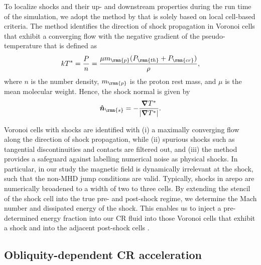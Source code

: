 \documentclass[8pt,a4paper,usenatbib]{mnras}
\newcommand{\CR}{\rmn{cr}}
\renewcommand{\th}{\rmn{th}}
\newcommand{\AREPO}{{\sc arepo}\xspace}
\newcommand{\bnabla}{\ensuremath{\boldsymbol{\nabla}}}
\begin{document}
To localize shocks and their up- and downstream properties during the run time
of the simulation, we adopt the method by \citet{2015MNRAS.446.3992S} that is
solely based on local cell-based criteria. The method identifies the direction
of shock propagation in Voronoi cells that exhibit a converging flow with the
negative gradient of the pseudo-temperature that is defined as
\begin{equation}
  \label{eq:temp}
  k T^* = \frac{P}{n} = \frac{\mu m_\rmn{p} (P_\th + P_\CR)}{\rho},
\end{equation}
where $n$ is the number density, $m_\rmn{p}$ is the proton rest mass, and $\mu$ is the
mean molecular weight. Hence, the shock normal is given by
\begin{equation}
  \label{eq:direction}
  \bm{\hat{n}}_\rmn{s} = -\frac{\bnabla T^*}{\left|\bnabla T^*\right|}.
\end{equation}

Voronoi cells with shocks are identified with (i) a maximally converging flow
along the direction of shock propagation, while (ii) spurious shocks such as
tangential discontinuities and contacts are filtered out, and (iii) the method
provides a safeguard against labelling numerical noise as physical shocks.  In
particular, in our study the magnetic field is dynamically irrelevant at the
shock, such that the non-MHD jump conditions are valid.  Typically, shocks in
\AREPO are numerically broadened to a width of two to three cells. By extending
the stencil of the shock cell into the true pre- and post-shock regime, we
determine the Mach number and dissipated energy of the shock. This enables us to
inject a pre-determined energy fraction into our CR fluid into those Voronoi
cells that exhibit a shock and into the adjacent post-shock cells
\citep[see][for more details]{2017MNRAS.465.4500P}.

\subsection{Obliquity-dependent CR acceleration}
\label{sec:obliquity}
\end{document}
